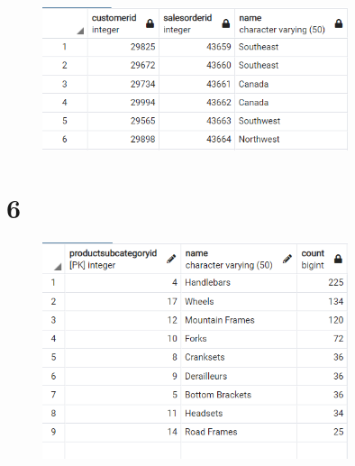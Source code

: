 \documentclass{article}
\begin{document}
\subsection{}
\begin{figure}[H]
    \centering
    \includegraphics[width=0.8\textwidth]{figures/5-d.png}
    \caption
	{
	}
    \label{fig:fig1}
\end{figure}

\section{6}
\begin{figure}[H]
    \centering
    \includegraphics[width=0.8\textwidth]{figures/6.png}
    \caption
	{
	}
    \label{fig:fig1}
\end{figure}
\end{document}
